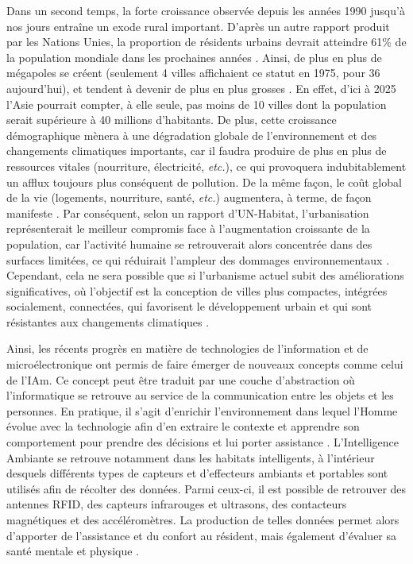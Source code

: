 Dans un second temps, la forte croissance observée depuis les années 1990 jusqu'à nos jours entraîne un exode rural important. D'après un autre rapport produit par les Nations Unies, la proportion de résidents urbains devrait atteindre 61\% de la population mondiale dans les prochaines années \citep{UnitedNations2017a}. Ainsi, de plus en plus de mégapoles se créent (seulement 4 villes affichaient ce statut en 1975, pour 36 aujourd'hui), et tendent à devenir de plus en plus grosses \citep{UnitedNations2017a}. En effet, d'ici à 2025 l'Asie pourrait compter, à elle seule, pas moins de 10 villes dont la population serait supérieure à 40 millions d'habitants. De plus, cette croissance démographique mènera à une dégradation globale de l'environnement et des changements climatiques importants, car il faudra produire de plus en plus de ressources vitales (nourriture, électricité, \textit{etc.}), ce qui provoquera indubitablement un afflux toujours plus conséquent de pollution. De la même façon, le coût global de la vie (logements, nourriture, santé, \textit{etc.}) augmentera, à terme, de façon manifeste \citep{UnitedNations2017a}. Par conséquent, selon un rapport d'UN-Habitat, l'urbanisation représenterait le meilleur compromis face à l'augmentation croissante de la population, car l'activité humaine se retrouverait alors concentrée dans des surfaces limitées, ce qui réduirait l'ampleur des dommages environnementaux \citep{UNFPA2007}. Cependant, cela ne sera possible que si l'urbanisme actuel subit des améliorations significatives, où l'objectif est la conception de villes plus compactes, intégrées socialement, connectées, qui favorisent le développement urbain et qui sont résistantes aux changements climatiques \citep{UNFPA2007}.

Ainsi, les récents progrès en matière de technologies de l'information et de microélectronique ont permis de faire émerger de nouveaux concepts comme celui de l'\ac{IAm}. Ce concept peut être traduit par une couche d'abstraction où l'informatique se retrouve au service de la communication entre les objets et les personnes. En pratique, il s'agit d'enrichir l'environnement dans lequel l'Homme évolue avec la technologie afin d'en extraire le contexte et apprendre son comportement pour prendre des décisions et lui porter assistance \citep{Sadri2011}. L'Intelligence Ambiante se retrouve notamment dans les habitats intelligents, à l'intérieur desquels différents types de capteurs et d'effecteurs ambiants et portables sont utilisés afin de récolter des données. Parmi ceux-ci, il est possible de retrouver des antennes RFID, des capteurs infrarouges et ultrasons, des contacteurs magnétiques et des accéléromètres. La production de telles données permet alors d'apporter de l'assistance et du confort au résident, mais également d'évaluer sa santé mentale et physique \citep{Rashidi2013, Haux2016, Harris2016, Johnson2018}.


